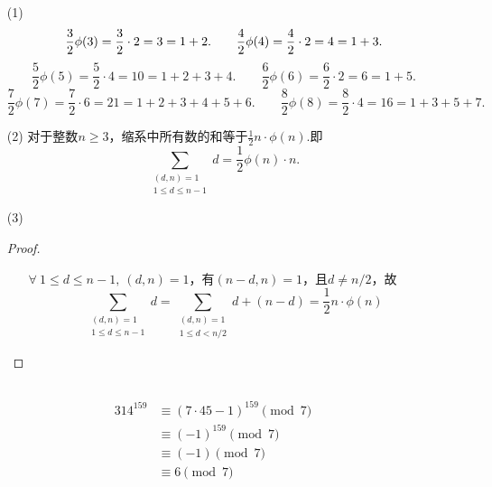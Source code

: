 \documentclass[UTF8]{ctexart}
\begin{document}
\subsection{}   %
\begin{enumerate}
    \item [(1)]
    \[
        \frac{3}{2} \phi(3) 
            = \frac{3}{2}\cdot 2  
            = 3 
            = 1 + 2. 
        \qquad
        \frac{4}{2} \phi(4)
            = \frac{4}{2} \cdot 2 \\
            = 4 \\
            = 1+3 .
    \]
    \[
        \frac{5}{2}\phi(5) = \frac{5}{2}\cdot 4 = 10 = 1+2+3+4.
        \qquad
        \frac{6}{2}\phi(6) = \frac{6}{2}\cdot 2 = 6 =1+5.
    \]
    \[
        \frac{7}{2}\phi(7) = \frac{7}{2}\cdot 6 = 21= 1+2+3+4+5+6.
        \qquad
        \frac{8}{2}\phi(8) = \frac{8}{2}\cdot 4 = 16 =1+3+5+7.
    \]
    \item [(2)]对于整数$n\geq 3$，缩系中所有数的和等于$\frac{1}{2} n \cdot \phi (n)$.即
    \[
        \sum\limits_{\substack{ (d,n)=1\\ 1\leq d\leq n-1} } d
        = \frac{1}{2}\phi(n) \cdot n.
    \]
    \item [(3)]
    \begin{proof}
        \begin{enumerate}
            \item []
            \item []$\forall\ 1 \leq d \leq n-1,\ (d,n)=1$，有$(n-d,n)=1$，且$d\neq n/2$，故
            \[
                \sum\limits_{\substack{ (d,n)=1\\ 1\leq d\leq n-1} } d
                =
                \sum\limits_{\substack{ (d,n)=1\\ 1\leq d < n/2 } } d + (n-d)
                =
                \frac{1}{2} n \cdot \phi(n)
            \]
        \end{enumerate}
         
    \end{proof}
\end{enumerate}

\subsection{}   %
\begin{align*}
    {314}^{159} 
    & \equiv {(7\cdot 45 - 1)}^{159} \pmod{7}\\
    & \equiv {(-1)}^{159} \pmod{7}\\
    & \equiv (-1) \pmod{7}\\
    & \equiv 6 \pmod{7}
\end{align*}
\end{document}
